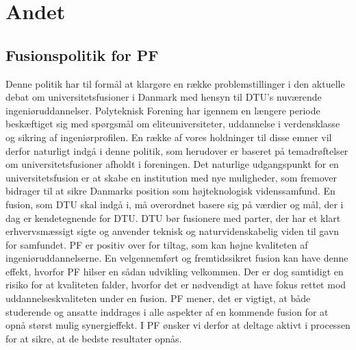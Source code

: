 \section{Andet}
\subsection{Fusionspolitik for PF}
Denne politik har til formål at klargøre en række problemstillinger i den aktuelle debat om universitetsfusioner i
Danmark med hensyn til DTU’s nuværende ingeniøruddannelser.
Polyteknisk Forening har igennem en længere periode beskæftiget sig med spørgsmål om eliteuniversiteter, uddannelse
i verdensklasse og sikring af ingeniørprofilen. En række af vores holdninger til disse emner vil derfor naturligt indgå i
denne politik, som herudover er baseret på temadrøftelser om universitetsfusioner afholdt i foreningen.
Det naturlige udgangspunkt for en universitetsfusion er at skabe en institution med nye muligheder, som fremover
bidrager til at sikre Danmarks position som højteknologisk videnssamfund. En fusion, som DTU skal indgå i, må
overordnet basere sig på værdier og mål, der i dag er kendetegnende for DTU. DTU bør fusionere med parter, der har et
klart erhvervsmæssigt sigte og anvender teknisk og naturvidenskabelig viden til gavn for samfundet.
PF er positiv over for tiltag, som kan højne kvaliteten af ingeniøruddannelserne. En velgennemført og fremtidssikret
fusion kan have denne effekt, hvorfor PF hilser en sådan udvikling velkommen. Der er dog samtidigt en risiko for at
kvaliteten falder, hvorfor det er nødvendigt at have fokus rettet mod uddannelseskvaliteten under en fusion. PF mener,
det er vigtigt, at både studerende og ansatte inddrages i alle aspekter af en kommende fusion for at opnå størst mulig
synergieffekt. I PF ønsker vi derfor at deltage aktivt i processen for at sikre, at de bedste resultater opnås.
